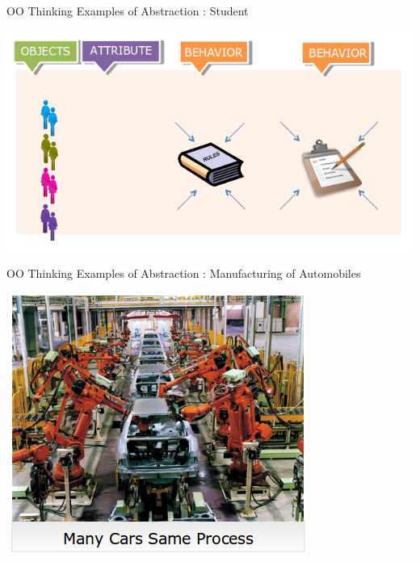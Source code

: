 \documentclass[14pt]{beamer}
\begin{document}
\begin{frame}{OO Thinking}
Examples of Abstraction : Student
\begin{center}
    \includegraphics[scale=0.5]{Image10.png}
\end{center}
\end{frame}
\begin{frame}{OO Thinking}
Examples of Abstraction : Manufacturing of Automobiles
\begin{center}
    \includegraphics[scale=0.5]{Image11.png}
\end{center}
\end{frame}
\end{document}
